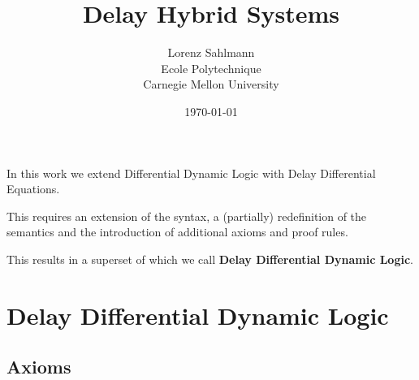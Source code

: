 \documentclass[10pt]{article}
\begin{document}
\title{Delay Hybrid Systems}

\author{Lorenz Sahlmann\\ Ecole Polytechnique\\ Carnegie Mellon University}
\date{\today}

\maketitle

In this work we extend Differential Dynamic Logic with Delay Differential Equations.

This requires an extension of the syntax, a (partially) redefinition of the semantics and the introduction of additional axioms and proof rules.

This results in a superset of \dL which we call \textbf{Delay Differential Dynamic Logic}.






%
\section{Delay Differential Dynamic Logic}
    \label{sec:delay-differential-dynamic-logic}

    \subsection{Axioms}
        \label{sec:axioms}



        \begin{calculus}
        \end{calculus}
\end{document}
